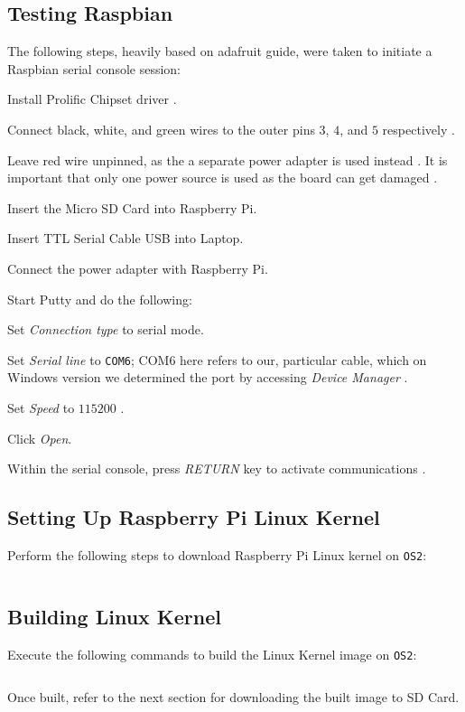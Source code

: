 \documentclass[onecolumn, draftclsnofoot, 10pt, compsoc]{IEEEtran}
\begin{document}
\subsection{Testing Raspbian}
The following steps, heavily based on adafruit guide, were taken to initiate a Raspbian serial console session:
\begin{description}
\item Install Prolific Chipset driver \cite{adafruit1}.
\item Connect black, white, and green wires to the outer pins $3$, $4$, and $5$ respectively \cite{adafruit1}.
\item Leave red wire unpinned, as the a separate power adapter is used instead \cite{adafruit1}. It is important that only one power source is used as the board can get damaged \cite{adafruit1}.
\item Insert the Micro SD Card into Raspberry Pi.
\item Insert TTL Serial Cable USB into Laptop.
\item Connect the power adapter with Raspberry Pi.
\item Start Putty and do the following:
\begin{description}
\item Set \textit{Connection type} to serial mode.
\item Set \textit{Serial line} to \texttt{COM6}; {COM6} here refers to our, particular cable, which on Windows version we determined the port by accessing \textit{Device Manager} \cite{adafruit1}.
\item Set \textit{Speed} to $115200$ \cite{adafruit1}.
\item Click \textit{Open}.
\end{description}
\item Within the serial console, press \textit{RETURN} key to activate communications \cite{adafruit1}.
\end{description}


\subsection{Setting Up Raspberry Pi Linux Kernel}
Perform the following steps to download Raspberry Pi Linux kernel on \texttt{OS2}:
\inputminted[breaklines]{bash}{cs1.sh}


\subsection{Building Linux Kernel}
Execute the following commands to build the Linux Kernel image on \texttt{OS2}:
\inputminted[breaklines]{bash}{cs3.sh}
Once built, refer to the next section for downloading the built image to SD Card.
\end{document}
